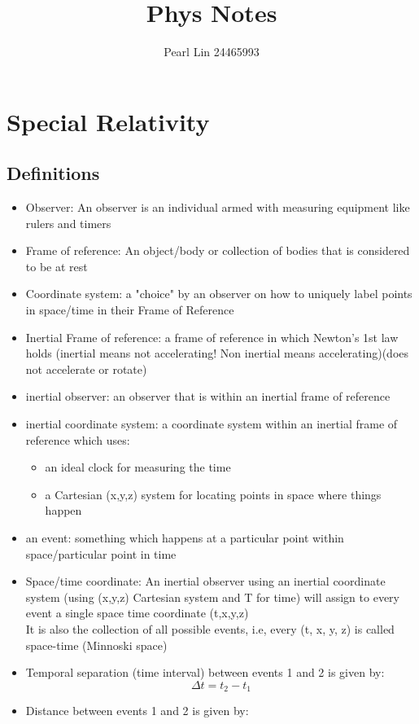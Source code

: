\documentclass[10pt]{report}
\author{Pearl Lin 24465993}
\title{Phys Notes}
\begin{document}
\maketitle
\chapter{Special Relativity}
\section{Definitions}
\begin{itemize}
	\item{Observer: An observer is an individual armed with measuring equipment like rulers and timers}
	\item{Frame of reference: An object/body or collection of bodies that is considered to be at rest}
	\item{Coordinate system: a "choice" by an observer on how to uniquely label points in space/time in their Frame of Reference}
	\item{Inertial Frame of reference: a frame of reference in which Newton's 1st law holds (inertial means not accelerating! Non inertial means accelerating)(does not accelerate or rotate)}
	\item{inertial observer: an observer that is within an inertial frame of reference}
	\item{inertial coordinate system: a coordinate system within an inertial frame of reference which uses:}
		\begin{itemize}
			\item{an ideal clock for measuring the time}
			\item{a Cartesian (x,y,z) system for locating points in space where things happen}
		\end{itemize}
	\item{an event: something which happens at a particular point within space/particular point in time}
	\item{Space/time coordinate: An inertial observer using an inertial coordinate system (using (x,y,z) Cartesian system and T for time) will assign to every event a single space time coordinate (t,x,y,z)\\ It is also the collection of all possible events, i.e, every (t, x, y, z) is called space-time (Minnoski space)}
	\item{Temporal separation (time interval) between events 1 and 2 is given by: \[
	\Delta t=t_{2}-t_{1}
	\] 
	}
	\item{Distance between events 1 and 2 is given by:
}
\end{itemize}
\end{document}
